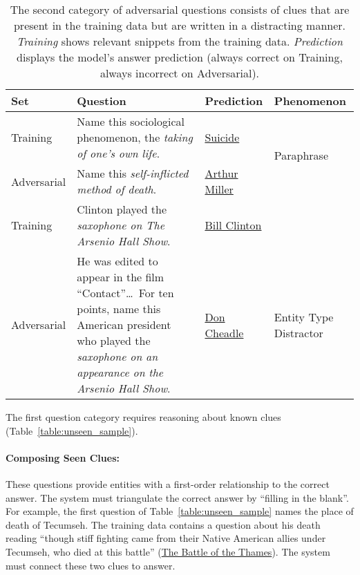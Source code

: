 \begin{table*}[t]
\centering
\begin{tabular}{p{1.75cm}p{8.5cm}lp{2cm}}
\hline
         Set & Question    & Prediction      & Phenomenon                  \\ \hline

Training & Name this sociological phenomenon, the \emph{taking of one's own life}. & \underline{Suicide} & \multirow{2}{*}{Paraphrase} \\
Adversarial  & Name this \emph{self-inflicted method of death}. & \underline{Arthur Miller} & \\ \hline

Training &  Clinton played the \emph{saxophone on The Arsenio Hall Show}.  & \underline{Bill Clinton} &  \\ 
Adversarial & He was edited to appear in the film ``Contact''\dots\ For ten points, name this American president who played the \emph{saxophone on an appearance on the Arsenio Hall Show}. & \underline{Don Cheadle} & Entity Type Distractor \\ \hline

\end{tabular}
\caption{The second category of adversarial questions consists of clues that are present in the training data but are written in a distracting manner. \emph{Training} shows relevant snippets from the training data. \emph{Prediction} displays the  model's answer prediction (always correct on Training, always incorrect on Adversarial).}
\label{table:rewrite_sample}
\end{table*}

The first question category requires reasoning about known clues (Table~\ref{table:unseen_sample}).~\smallskip

\paragraph{Composing Seen Clues:} These questions provide entities with a first-order
relationship to the correct answer. The system must 
triangulate the correct answer by ``filling in the blank''. For
example, the first question of Table~\ref{table:unseen_sample} names the
place of death of Tecumseh. The training data contains a
question about his death reading
``though stiff fighting came from their Native American allies under
Tecumseh, who died at this battle'' (\underline{The Battle of the Thames}). The system must connect these two
clues to answer.~\smallskip

